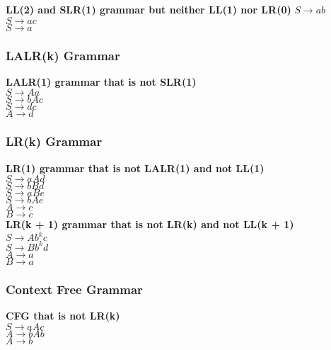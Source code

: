 \textbf{LL(2) and SLR(1) grammar but neither LL(1) nor LR(0)} %
    $S\rightarrow ab$\\
    $S\rightarrow ac$\\
    $S\rightarrow a$\\
    
\subsubsection{LALR(k) Grammar}
\textbf{LALR(1) grammar that is not SLR(1)}\\ %
    $S \rightarrow Aa$\\
    $S \rightarrow bAc$\\
    $S \rightarrow dc$\\
    $A \rightarrow d$\\
    
\subsubsection{LR(k) Grammar}
\textbf{LR(1) grammar that is not LALR(1) and not LL(1)}\\ %
    $S\rightarrow aAd$\\
    $S\rightarrow bBd$\\
    $S\rightarrow aBe$\\
    $S\rightarrow bAe$\\
    $A\rightarrow c$\\
    $B\rightarrow c$\\

\textbf{LR(k + 1) grammar that is not LR(k) and not LL(k + 1)}\\ %
    $S\rightarrow Ab^k c$\\
    $S\rightarrow Bb^k d$\\
    $A\rightarrow a$\\
    $B\rightarrow a$\\

\subsubsection{Context Free Grammar}
\textbf{CFG that is not LR(k)}\\ %
    $S \rightarrow aAc$\\
    $A \rightarrow bAb$\\
    $A  \rightarrow b$\\
    
